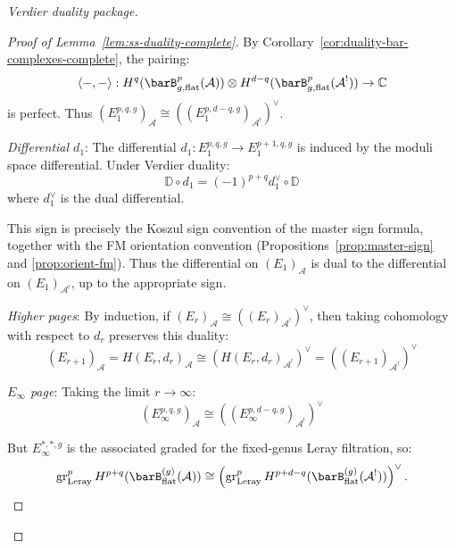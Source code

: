 \begin{proof}[Verdier duality package]
\begin{proof}[Proof of Lemma~\ref{lem:ss-duality-complete}]
By Corollary~\ref{cor:duality-bar-complexes-complete}, the pairing:
\begin{equation}
\langle -, - \rangle: H^q(\barB^p_{g,\mathrm{flat}}(\mathcal{A})) \otimes
H^{d-q}(\barB^p_{g,\mathrm{flat}}(\mathcal{A}^!)) \to \mathbb{C}
\end{equation}
is perfect. Thus $(E_1^{p,q,g})_{\mathcal{A}} \cong ((E_1^{p,d-q,g})_{\mathcal{A}^!})^\vee$.

\emph{Differential $d_1$}: The differential $d_1: E_1^{p,q,g} \to E_1^{p+1,q,g}$ is
induced by the moduli space differential. Under Verdier duality:
\begin{equation}
\mathbb{D} \circ d_1 = (-1)^{p+q} d_1^\vee \circ \mathbb{D}
\end{equation}
where $d_1^\vee$ is the dual differential.

This sign is precisely the Koszul sign convention of the master sign
formula, together with the FM orientation convention
\textup{(}Propositions~\textup{\ref{prop:master-sign}} and
\textup{\ref{prop:orient-fm}}\textup{)}.
Thus the differential on $(E_1)_{\mathcal{A}}$ is dual to the differential on
$(E_1)_{\mathcal{A}^!}$, up to the appropriate sign.

\emph{Higher pages}: By induction, if $(E_r)_{\mathcal{A}} \cong ((E_r)_{\mathcal{A}^!})^\vee$,
then taking cohomology with respect to $d_r$ preserves this duality:
\begin{equation}
(E_{r+1})_{\mathcal{A}} = H(E_r, d_r)_{\mathcal{A}} \cong (H(E_r, d_r)_{\mathcal{A}^!})^\vee
= ((E_{r+1})_{\mathcal{A}^!})^\vee
\end{equation}

\emph{$E_\infty$ page}: Taking the limit $r \to \infty$:
\begin{equation}
(E_\infty^{p,q,g})_{\mathcal{A}} \cong ((E_\infty^{p,d-q,g})_{\mathcal{A}^!})^\vee
\end{equation}

But $E_\infty^{*,*,g}$ is the associated graded for the fixed-genus
Leray filtration, so:
\begin{equation}
\operatorname{gr}^{p}_{\mathrm{Leray}}
H^{p+q}(\barB^{(g)}_{\mathrm{flat}}(\mathcal{A}))
\cong
\left(
\operatorname{gr}^{p}_{\mathrm{Leray}}
H^{p+d-q}(\barB^{(g)}_{\mathrm{flat}}(\mathcal{A}^!))
\right)^\vee .
\end{equation}
\end{proof}


\end{proof}
